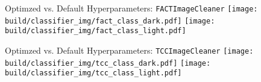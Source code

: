 \begin{frame}{Optimzed vs. Default Hyperparameters: \texttt{FACTImageCleaner}}
    {%
    \centering
    \texttt{[image: build/classifier\_img/fact\_class\_dark.pdf]}
    }
    {%
    \centering
    \texttt{[image: build/classifier\_img/fact\_class\_light.pdf]}
    }
\end{frame}

\begin{frame}{Optimzed vs. Default Hyperparameters: \texttt{TCCImageCleaner}}
    {%
    \centering
    \texttt{[image: build/classifier\_img/tcc\_class\_dark.pdf]}
    }
    {%
    \centering
    \texttt{[image: build/classifier\_img/tcc\_class\_light.pdf]}
    }
\end{frame}